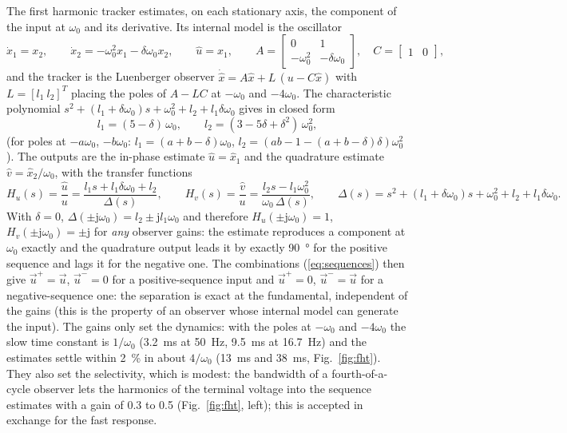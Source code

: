 \documentclass[10pt,a4paper]{scrartcl}
\newcommand{\wo}{\omega_0}
\newcommand{\jj}{\mathrm{j}}
\newcommand{\uhat}{\hat{u}}
\newcommand{\vhat}{\hat{v}}
\begin{document}
\begin{onehalfspace}
The first harmonic tracker estimates, on each stationary axis, the component of the input at $\wo$ and its derivative. Its internal model is the oscillator
\begin{equation}
\dot x_1 = x_2, \qquad \dot x_2 = -\wo^2 x_1 - \delta\wo x_2, \qquad \uhat = x_1,
\qquad A = \begin{bmatrix} 0 & 1 \\ -\wo^2 & -\delta\wo \end{bmatrix}, \quad C = \begin{bmatrix} 1 & 0 \end{bmatrix},
\label{eq:fht_model}
\end{equation}
and the tracker is the Luenberger observer $\dot{\hat x} = A\hat x + L\,(u - C\hat x)$ with $L = [l_1\ l_2]^T$ placing the poles of $A - LC$ at $-\wo$ and $-4\wo$. The characteristic polynomial $s^2 + (l_1 + \delta\wo)s + \wo^2 + l_2 + l_1\delta\wo$ gives in closed form
\begin{equation}
l_1 = (5 - \delta)\,\wo, \qquad l_2 = (3 - 5\delta + \delta^2)\,\wo^2,
\label{eq:fht_gains}
\end{equation}
(for poles at $-a\wo$, $-b\wo$: $l_1 = (a + b - \delta)\wo$, $l_2 = (ab - 1 - (a + b - \delta)\delta)\wo^2$). The outputs are the in-phase estimate $\uhat = \hat x_1$ and the quadrature estimate $\vhat = \hat x_2/\wo$, with the transfer functions
\begin{equation}
H_u(s) = \frac{\uhat}{u} = \frac{l_1 s + l_1\delta\wo + l_2}{\Delta(s)}, \qquad
H_v(s) = \frac{\vhat}{u} = \frac{l_2 s - l_1\wo^2}{\wo\,\Delta(s)}, \qquad
\Delta(s) = s^2 + (l_1 + \delta\wo)s + \wo^2 + l_2 + l_1\delta\wo.
\label{eq:fht_tf}
\end{equation}
With $\delta = 0$, $\Delta(\pm\jj\wo) = l_2 \pm \jj l_1\wo$ and therefore $H_u(\pm\jj\wo) = 1$, $H_v(\pm\jj\wo) = \pm\jj$ for \emph{any} observer gains: the estimate reproduces a component at $\wo$ exactly and the quadrature output leads it by exactly \SI{90}{\degree} for the positive sequence and lags it for the negative one. The combinations (\ref{eq:sequences}) then give $\vec u^+ = \vec u$, $\vec u^- = 0$ for a positive-sequence input and $\vec u^+ = 0$, $\vec u^- = \vec u$ for a negative-sequence one: the separation is exact at the fundamental, independent of the gains (this is the property of an observer whose internal model can generate the input). The gains only set the dynamics: with the poles at $-\wo$ and $-4\wo$ the slow time constant is $1/\wo$ (\SI{3.2}{ms} at \SI{50}{Hz}, \SI{9.5}{ms} at \SI{16.7}{Hz}) and the estimates settle within \SI{2}{\percent} in about $4/\wo$ (\SI{13}{ms} and \SI{38}{ms}, Fig.~\ref{fig:fht}). They also set the selectivity, which is modest: the bandwidth of a fourth-of-a-cycle observer lets the harmonics of the terminal voltage into the sequence estimates with a gain of 0.3 to 0.5 (Fig.~\ref{fig:fht}, left); this is accepted in exchange for the fast response.


\end{onehalfspace}
\end{document}
